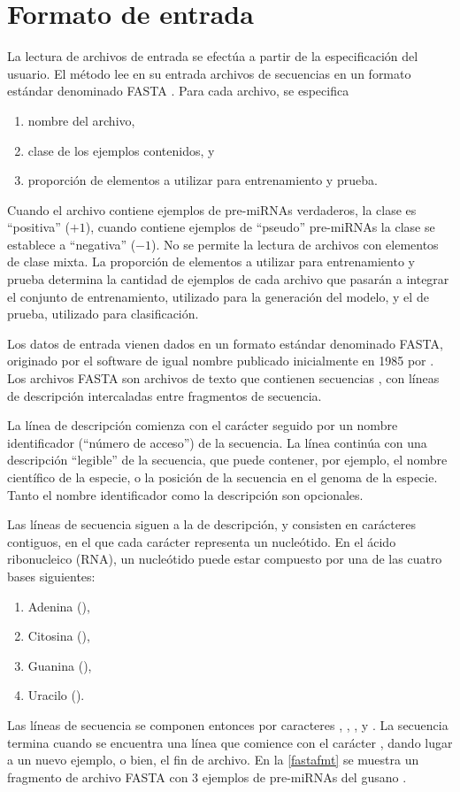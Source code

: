 %
%
%
\section{Formato de entrada}
%
La lectura de archivos de entrada se efectúa a partir de la
especificación del usuario. El método lee en su entrada archivos de
secuencias en un formato estándar denominado FASTA \cite{fasta}.
Para cada archivo, se especifica
%
\begin{enumerate}
\item nombre del archivo,
\item clase de los ejemplos contenidos, y
\item proporción de elementos a utilizar para entrenamiento y prueba.
\end{enumerate}
%
Cuando el archivo contiene ejemplos de pre-miRNAs verdaderos, la clase
es ``positiva'' ($+1$), cuando contiene ejemplos de ``pseudo''
pre-miRNAs la clase se establece a ``negativa'' ($-1$).  No se permite
la lectura de archivos con elementos de clase mixta.  La proporción de
elementos a utilizar para entrenamiento y prueba determina la cantidad
de ejemplos de cada archivo que pasarán a integrar el conjunto de
entrenamiento, utilizado para la generación del modelo, y el de
prueba, utilizado para clasificación.

Los datos de entrada vienen dados en un formato estándar denominado
FASTA, originado por el software de igual nombre publicado
inicialmente en 1985 por \citeauthor{fasta} \cite{fasta}.  Los
archivos FASTA son archivos de texto que contienen secuencias
, con líneas de descripción intercaladas entre fragmentos
de secuencia.

La línea de descripción comienza con el carácter \mono{>} seguido por
un nombre identificador (``número de acceso'') de la secuencia.  La
línea continúa con una descripción ``legible'' de la secuencia, que
puede contener, por ejemplo, el nombre científico de la especie, o la
posición de la secuencia en el genoma de la especie.  Tanto el nombre
identificador como la descripción son opcionales.

Las líneas de secuencia siguen a la de descripción, y consisten en
carácteres contiguos, en el que cada carácter representa un
nucleótido. En el ácido ribonucleico (RNA), un nucleótido puede estar
compuesto por una de las cuatro bases siguientes:

\begin{enumerate}
\item Adenina (),
\item Citosina (),
\item Guanina (),
\item Uracilo ().
\end{enumerate}
Las líneas de secuencia se componen entonces por caracteres ,
, , y .  La secuencia termina cuando se
encuentra una línea que comience con el carácter \mono{>}, dando lugar
a un nuevo ejemplo, o bien, el fin de archivo.
En la \autoref{fastafmt} se muestra un fragmento de archivo FASTA
con 3 ejemplos de pre-miRNAs del gusano .
